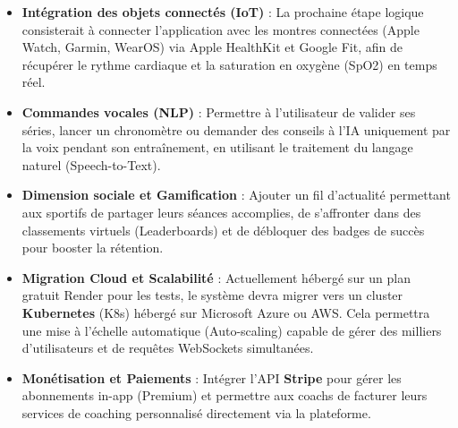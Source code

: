 \begin{itemize}
    \item \textbf{Intégration des objets connectés (IoT)} : La prochaine étape logique consisterait à connecter l'application avec les montres connectées (Apple Watch, Garmin, WearOS) via Apple HealthKit et Google Fit, afin de récupérer le rythme cardiaque et la saturation en oxygène (SpO2) en temps réel.
    \item \textbf{Commandes vocales (NLP)} : Permettre à l'utilisateur de valider ses séries, lancer un chronomètre ou demander des conseils à l'IA uniquement par la voix pendant son entraînement, en utilisant le traitement du langage naturel (Speech-to-Text).
    \item \textbf{Dimension sociale et Gamification} : Ajouter un fil d'actualité permettant aux sportifs de partager leurs séances accomplies, de s'affronter dans des classements virtuels (Leaderboards) et de débloquer des badges de succès pour booster la rétention.
    \item \textbf{Migration Cloud et Scalabilité} : Actuellement hébergé sur un plan gratuit Render pour les tests, le système devra migrer vers un cluster \textbf{Kubernetes} (K8s) hébergé sur Microsoft Azure ou AWS. Cela permettra une mise à l'échelle automatique (Auto-scaling) capable de gérer des milliers d'utilisateurs et de requêtes WebSockets simultanées.
    \item \textbf{Monétisation et Paiements} : Intégrer l'API \textbf{Stripe} pour gérer les abonnements in-app (Premium) et permettre aux coachs de facturer leurs services de coaching personnalisé directement via la plateforme.
\end{itemize}